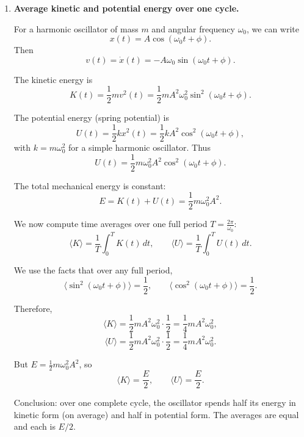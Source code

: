 \documentclass[12pt]{article}
\begin{document}
\begin{enumerate}
We can also express $\phi$ in terms of $x_0,v_0$ using
\[
\phi = \arctan2\!\left(-\frac{v_0}{A\omega_0}, \frac{x_0}{A}\right),
\]
where $\arctan2(y,x)$ is the correct quadrant angle with $\cos\phi = x_0/A$ and $\sin\phi = -v_0/(A\omega_0)$.

Summary: the first time the oscillator reaches an endpoint ($|x|=A$) after $t=0$ is given by the smallest positive member of $t_n = (n\pi-\phi)/\omega_0$.

Physically: the oscillator reaches maximum displacement whenever its velocity first becomes zero.


\item \textbf{Average kinetic and potential energy over one cycle.}

For a harmonic oscillator of mass $m$ and angular frequency $\omega_0$, we can write
\[
x(t) = A \cos(\omega_0 t + \phi).
\]
Then
\[
v(t) = \dot{x}(t) = -A \omega_0 \sin(\omega_0 t + \phi).
\]

The kinetic energy is
\[
K(t) = \frac{1}{2} m v^2(t)
= \frac{1}{2} m A^2 \omega_0^2 \sin^2(\omega_0 t + \phi).
\]

The potential energy (spring potential) is
\[
U(t) = \frac{1}{2} k x^2(t)
= \frac{1}{2} k A^2 \cos^2(\omega_0 t + \phi),
\]
with $k = m \omega_0^2$ for a simple harmonic oscillator. Thus
\[
U(t) = \frac{1}{2} m \omega_0^2 A^2 \cos^2(\omega_0 t + \phi).
\]

The total mechanical energy is constant:
\[
E = K(t)+U(t)
= \frac{1}{2} m \omega_0^2 A^2.
\]

We now compute time averages over one full period $T = \frac{2\pi}{\omega_0}$:
\[
\langle K \rangle
= \frac{1}{T} \int_0^T K(t)\, dt,
\qquad
\langle U \rangle
= \frac{1}{T} \int_0^T U(t)\, dt.
\]

We use the facts that over any full period,
\[
\langle \sin^2(\omega_0 t + \phi) \rangle = \frac{1}{2},
\qquad
\langle \cos^2(\omega_0 t + \phi) \rangle = \frac{1}{2}.
\]

Therefore,
\[
\langle K \rangle
= \frac{1}{2} m A^2 \omega_0^2 \cdot \frac{1}{2}
= \frac{1}{4} m A^2 \omega_0^2,
\]
\[
\langle U \rangle
= \frac{1}{2} m A^2 \omega_0^2 \cdot \frac{1}{2}
= \frac{1}{4} m A^2 \omega_0^2.
\]

But $E = \tfrac{1}{2} m \omega_0^2 A^2$, so
\[
\langle K \rangle = \frac{E}{2},
\qquad
\langle U \rangle = \frac{E}{2}.
\]

Conclusion: over one complete cycle, the oscillator spends half its energy in kinetic form (on average) and half in potential form. The averages are equal and each is $E/2$.



\end{enumerate}
\end{document}
